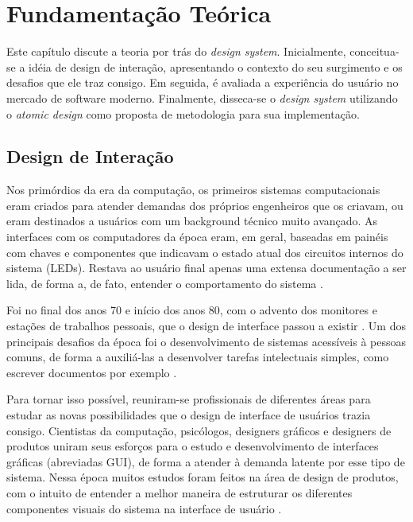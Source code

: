 
\chapter{Fundamentação Teórica}
\label{chap:fundamentacaoTeorica}

Este capítulo discute a teoria por trás do \textit{design system}. Inicialmente, conceitua-se a idéia de design de interação, apresentando o contexto do seu surgimento e os desafios que ele traz consigo. Em seguida, é avaliada a experiência do usuário no mercado de software moderno. Finalmente, disseca-se o \textit{design system} utilizando o \textit{atomic design} como proposta de metodologia para sua implementação.

\section{Design de Interação}
\label{sec:designInteracao}

Nos primórdios da era da computação, os primeiros sistemas computacionais eram criados para atender demandas dos próprios engenheiros que os criavam, ou eram destinados a usuários com um background técnico muito avançado. As interfaces com os computadores da época eram, em geral, baseadas em painéis com chaves e componentes que indicavam o estado atual dos circuitos internos do sistema (LEDs). Restava ao usuário final apenas uma extensa documentação a ser lida, de forma a, de fato, entender o comportamento do sistema \cite{preece2005design}.

Foi no final dos anos 70 e início dos anos 80, com o advento dos monitores e estações de trabalhos pessoais, que o design de interface passou a existir \cite{grudin1990computer}. Um dos principais desafios da época foi o desenvolvimento de sistemas acessíveis à pessoas comuns, de forma a auxiliá-las a desenvolver tarefas intelectuais simples, como escrever documentos por exemplo \cite{preece2005design}.

Para tornar isso possível, reuniram-se profissionais de diferentes áreas para estudar as novas possibilidades que o design de interface de usuários trazia consigo. Cientistas da computação, psicólogos, designers gráficos e designers de produtos uniram seus esforços para o estudo e desenvolvimento de interfaces gráficas (abreviadas GUI), de forma a atender à demanda latente por esse tipo de sistema. Nessa época muitos estudos foram feitos na área de design de produtos, com o intuito de entender a melhor maneira de estruturar os diferentes componentes visuais do sistema na interface de usuário \cite{preece2005design}.

